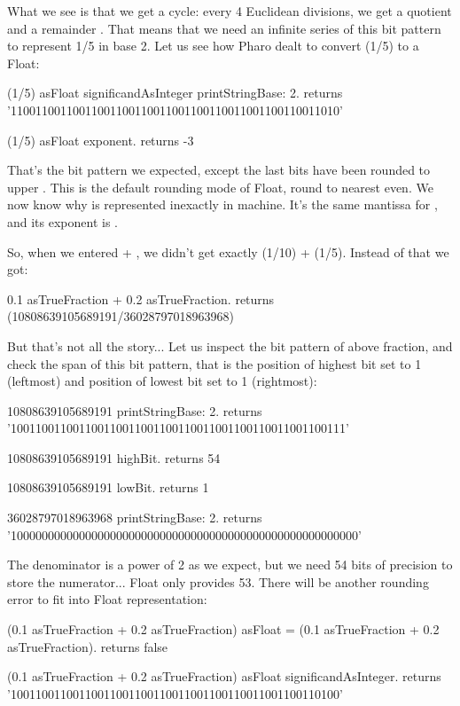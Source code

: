 \documentclass[a4paper,10pt,twoside]{book}
\begin{document}
What we see is that we get a cycle: every 4 Euclidean divisions, we get a quotient  and a remainder . That means that we need an infinite series of this bit pattern  to represent 1/5 in base 2. Let us see how Pharo dealt to convert (1/5) to a Float:

 \begin{code}{}
(1/5) asFloat significandAsInteger printStringBase: 2.
	returns '11001100110011001100110011001100110011001100110011010'
	
(1/5) asFloat exponent.
	returns -3
\end{code}

That's the bit pattern we expected, except the last bits  have been rounded to upper . This is the default rounding mode of Float, round to nearest even. We now know why  is represented inexactly in machine. It's the same mantissa for , and its exponent is .

So, when we entered  + , we didn't get exactly (1/10) + (1/5).
Instead of that we got:

 \begin{code}{}
0.1 asTrueFraction + 0.2 asTrueFraction.
	returns  (10808639105689191/36028797018963968)
\end{code}

But that's not all the story... Let us inspect the bit pattern of above fraction, and check the span of this bit pattern, that is the position of highest bit set to 1 (leftmost) and position of lowest bit set to 1 (rightmost):
 \begin{code}{}
10808639105689191 printStringBase: 2.
	returns  '100110011001100110011001100110011001100110011001100111'
	
10808639105689191 highBit.
	returns  54
	
10808639105689191 lowBit.
	returns  1

36028797018963968 printStringBase: 2.
	returns  '10000000000000000000000000000000000000000000000000000000'
\end{code}

The denominator is a power of 2 as we expect, but we need 54 bits of precision to store the numerator... Float only provides 53. There will be another rounding error to fit into Float representation:

\begin{code}{}
(0.1 asTrueFraction + 0.2 asTrueFraction) asFloat = (0.1 asTrueFraction + 0.2 asTrueFraction).
	returns false
	
(0.1 asTrueFraction + 0.2 asTrueFraction) asFloat significandAsInteger.
	returns '10011001100110011001100110011001100110011001100110100'
\end{code}
\end{document}
